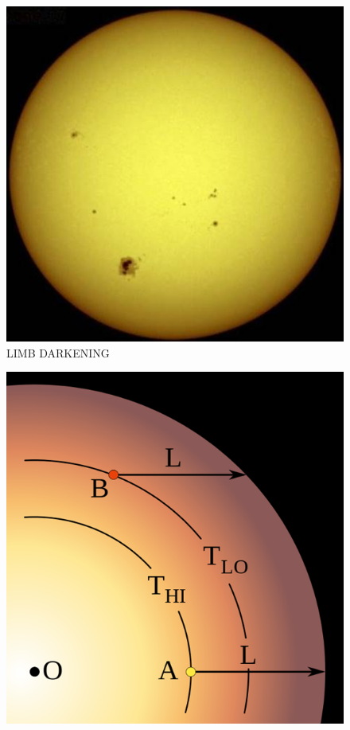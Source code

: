 \documentclass[a4paper,11pt]{article}
\begin{document}
\begin{figure}[h]
    \centering
    \includegraphics{limb dark 1.jpg}
    \caption{LIMB DARKENING}
\end{figure}

\begin{figure}[h!!]
    \centering
    \includegraphics{limb dark 2.png}
\end{figure}
\end{document}
